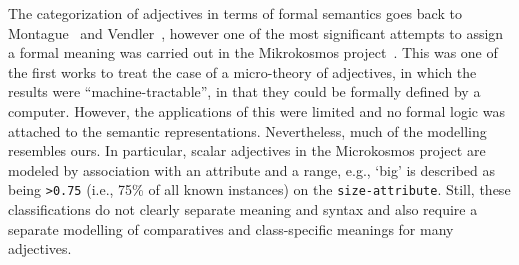 \documentclass[11pt]{article}
\begin{document}
The categorization of adjectives in terms of formal semantics goes back to Montague~ and Vendler~, however one of the most significant attempts to assign a formal meaning was carried out in the Mikrokosmos project~\cite{raskin1995lexical}. This was one of the first works to treat the case of a micro-theory of adjectives, in which the results were ``machine-tractable'', in that they could be formally defined by a computer. However, the applications of this were limited and no formal logic was attached to the semantic representations. Nevertheless, much of the modelling resembles ours. In particular, scalar adjectives in the Microkosmos project are modeled by association with an attribute and a range, e.g., `big' is described as being {\tt >0.75} (i.e., 75\% of all known instances) on the {\tt size-attribute}. Still, these classifications do not clearly separate meaning and syntax and also require a separate modelling of comparatives and class-specific meanings for many adjectives.
\end{document}

